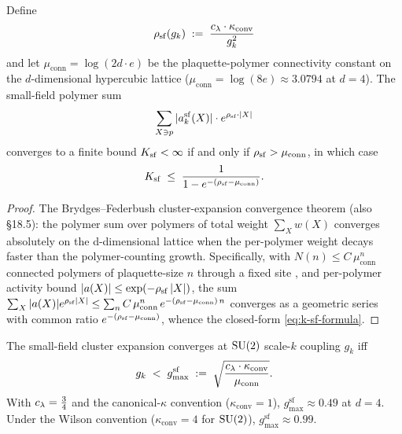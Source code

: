 \begin{theorem}
\label{thm:ksf-convergence}
Define
\begin{equation}
  \label{eq:rho-sf}
  \rho_{\mathrm{sf}}(g_k) \;:=\; \frac{c_\lambda \cdot \kappa_{\mathrm{conv}}}{g_k^2}
\end{equation}
and let $\mu_{\mathrm{conn}} = \log(2d \cdot e)$ be the
plaquette-polymer connectivity constant on the $d$-dimensional
hypercubic lattice
($\mu_{\mathrm{conn}} = \log(8e) \approx 3.0794$ at $d = 4$).
The small-field polymer sum
\begin{equation}
  \label{eq:polymer-sum-sf}
  \sum_{X \ni p} |a_k^{\mathrm{sf}}(X)| \cdot e^{\rho_{\mathrm{sf}} \cdot |X|}
\end{equation}
converges to a finite bound $K_{\mathrm{sf}} < \infty$ if and only if
$\rho_{\mathrm{sf}} > \mu_{\mathrm{conn}}$, in which case
\begin{equation}
  \label{eq:k-sf-formula}
  K_{\mathrm{sf}}
  \;\le\;
  \frac{1}{1 - e^{-(\rho_{\mathrm{sf}} - \mu_{\mathrm{conn}})}} .
\end{equation}
\end{theorem}

\begin{proof}
The Brydges--Federbush cluster-expansion convergence theorem
\cite{BrydgesFederbush1978} (also \cite{GlimmJaffe1987} \S18.5):
the polymer sum over polymers of total weight $\sum_X w(X)$
converges absolutely on the d-dimensional lattice when the per-polymer
weight decays faster than the polymer-counting growth.
Specifically, with $N(n) \le C\,\mu_{\mathrm{conn}}^n$ connected
polymers of plaquette-size $n$ through a fixed site
\cite{Cammarota1982}, and per-polymer activity bound
$|a(X)| \le \exp(-\rho_{\mathrm{sf}}\,|X|)$, the sum
$\sum_X |a(X)| e^{\rho_{\mathrm{sf}}|X|} \le
\sum_n C\,\mu_{\mathrm{conn}}^n\,e^{-(\rho_{\mathrm{sf}} - \mu_{\mathrm{conn}})\,n}$
converges as a geometric series with common ratio
$e^{-(\rho_{\mathrm{sf}} - \mu_{\mathrm{conn}})}$, whence the closed-form
\eqref{eq:k-sf-formula}.
\end{proof}

%

\begin{corollary}
\label{cor:sf-convergent-regime}
The small-field cluster expansion converges at $\mathrm{SU}(2)$ scale-$k$
coupling $g_k$ iff
\begin{equation}
  \label{eq:sf-convergent-regime}
  g_k \;<\; g_{\max}^{\mathrm{sf}}
  \;:=\;
  \sqrt{\frac{c_\lambda \cdot \kappa_{\mathrm{conv}}}{\mu_{\mathrm{conn}}}} .
\end{equation}
With $c_\lambda = \tfrac34$ and the canonical-$\kappa$ convention
($\kappa_{\mathrm{conv}} = 1$), $g_{\max}^{\mathrm{sf}} \approx
0.49$ at $d = 4$.  Under the Wilson convention
($\kappa_{\mathrm{conv}} = 4$ for $\mathrm{SU}(2)$), $g_{\max}^{\mathrm{sf}}
\approx 0.99$.
\end{corollary}

